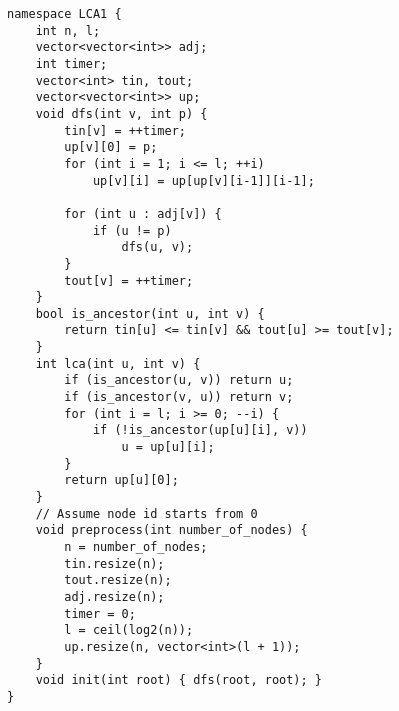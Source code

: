 \documentclass[10pt]{article}{\twocolumn}
\begin{document}
\begin{lstlisting}
namespace LCA1 {
    int n, l;
    vector<vector<int>> adj;
    int timer;
    vector<int> tin, tout;
    vector<vector<int>> up;
    void dfs(int v, int p) {
        tin[v] = ++timer;
        up[v][0] = p;
        for (int i = 1; i <= l; ++i)
            up[v][i] = up[up[v][i-1]][i-1];

        for (int u : adj[v]) {
            if (u != p)
                dfs(u, v);
        }
        tout[v] = ++timer;
    }
    bool is_ancestor(int u, int v) {
        return tin[u] <= tin[v] && tout[u] >= tout[v];
    }
    int lca(int u, int v) {
        if (is_ancestor(u, v)) return u;
        if (is_ancestor(v, u)) return v;
        for (int i = l; i >= 0; --i) {
            if (!is_ancestor(up[u][i], v))
                u = up[u][i];
        }
        return up[u][0];
    }
    // Assume node id starts from 0
    void preprocess(int number_of_nodes) {
        n = number_of_nodes;
        tin.resize(n);
        tout.resize(n);
        adj.resize(n);
        timer = 0;
        l = ceil(log2(n));
        up.resize(n, vector<int>(l + 1));
    }
    void init(int root) { dfs(root, root); }
}
\end{lstlisting}
\end{document}
